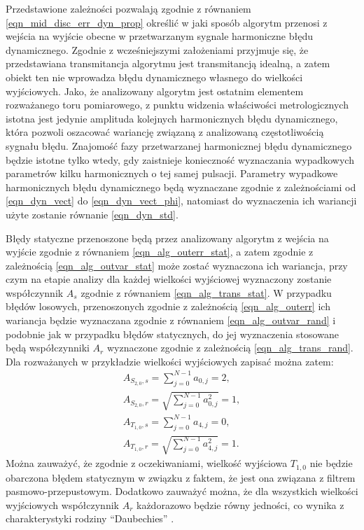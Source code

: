 Przedstawione zależności pozwalają zgodnie z równaniem \eqref{eqn_mid_disc_err_dyn_prop} określić w jaki sposób algorytm przenosi z wejścia na wyjście obecne w przetwarzanym sygnale harmoniczne błędu dynamicznego. Zgodnie z wcześniejszymi założeniami przyjmuje się, że przedstawiana transmitancja algorytmu jest transmitancją idealną, a zatem obiekt ten nie wprowadza błędu dynamicznego własnego do wielkości wyjściowych. Jako, że analizowany algorytm jest ostatnim elementem rozważanego toru pomiarowego, z punktu widzenia właściwości metrologicznych istotna jest jedynie amplituda kolejnych harmonicznych błędu dynamicznego, która pozwoli oszacować wariancję związaną z analizowaną częstotliwością sygnału błędu. Znajomość fazy przetwarzanej harmonicznej błędu dynamicznego będzie istotne tylko wtedy, gdy zaistnieje konieczność wyznaczania wypadkowych parametrów kilku harmonicznych o tej samej pulsacji. Parametry wypadkowe harmonicznych błędu dynamicznego będą wyznaczane zgodnie z zależnościami od \eqref{eqn_dyn_vect} do \eqref{eqn_dyn_vect_phi}, natomiast do wyznaczenia ich wariancji użyte zostanie równanie \eqref{eqn_dyn_std}.

Błędy statyczne przenoszone będą przez analizowany algorytm z wejścia na wyjście zgodnie z równaniem \eqref{eqn_alg_outerr_stat}, a zatem zgodnie z zależnością \eqref{eqn_alg_outvar_stat} może zostać wyznaczona ich wariancja, przy czym na etapie analizy dla każdej wielkości wyjściowej wyznaczony zostanie współczynnik $A_{s}$ zgodnie z równaniem \eqref{eqn_alg_trans_stat}. W przypadku błędów losowych, przenoszonych zgodnie z zależnością \eqref{eqn_alg_outerr} ich wariancja będzie wyznaczana zgodnie z równaniem \eqref{eqn_alg_outvar_rand} i podobnie jak w przypadku błędów statycznych, do jej wyznaczenia stosowane będą współczynniki $A_{r}$ wyznaczone zgodnie z zależnością \eqref{eqn_alg_trans_rand}. Dla rozważanych w przykładzie wielkości wyjściowych zapisać można zatem:
\begin{gather}
A_{S_{2,0},s} = \sum _{j = 0} ^{N-1} a_{0, j} = 2 \label{eqn_sym_partd_output_as_S_2_0}, \\
A_{S_{2,0},r} = \sqrt{\sum _{j = 0} ^{N-1} a_{0, j}^{2}} = 1 \label{eqn_sym_partd_output_ar_S_2_0}, \\
A_{T_{1,0},s} = \sum _{j = 0} ^{N-1} a_{4, j} = 0 \label{eqn_sym_partd_output_as_T_1_0}, \\
A_{T_{1,0},r} = \sqrt{\sum _{j = 0} ^{N-1} a_{4, j}^{2}} = 1 \label{eqn_sym_partd_output_ar_T_1_0}.
\end{gather}
Można zauważyć, że zgodnie z oczekiwaniami, wielkość wyjściowa $T_{1,0}$ nie będzie obarczona błędem statycznym w związku z faktem, że jest ona związana z filtrem pasmowo-przepustowym. Dodatkowo zauważyć można, że dla wszystkich wielkości wyjściowych współczynnik $A_{r}$ każdorazowo będzie równy jedności, co wynika z charakterystyki rodziny \enquote{Daubechies} \cite{vonesch_dbbasics, wei_coiflet}.

